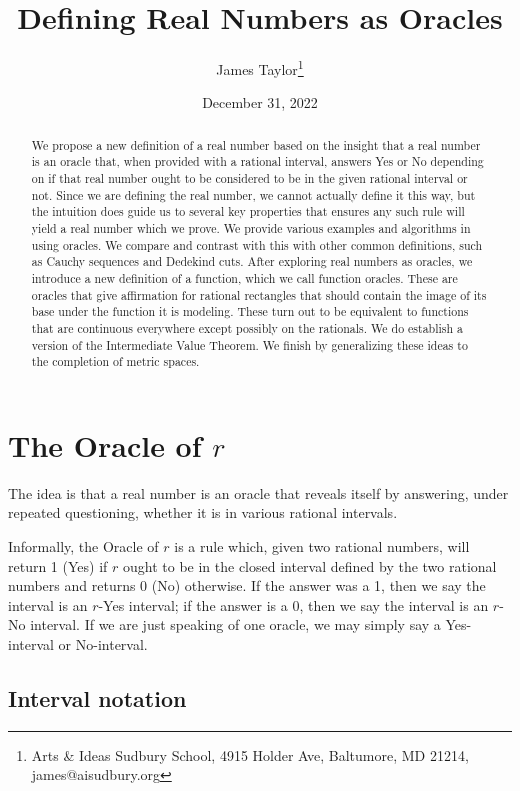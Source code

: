 \documentclass[12pt]{article}
\title{Defining Real Numbers as Oracles}
\author{
  James Taylor\footnote{Arts \& Ideas Sudbury School, 4915 Holder Ave, Baltumore, MD 21214, james@aisudbury.org}
}
\date{December 31, 2022}
\theoremstyle{remark}
\begin{document}
\maketitle
\begin{abstract}
 We propose a new definition of a real number based on the insight that a real number is an oracle that, when provided with a rational interval, answers Yes or No depending on if that real number ought to be considered to be in the given rational interval or not. Since we are defining the real number, we cannot actually define it this way, but the intuition does guide us to several key properties that ensures any such rule will yield a real number which we prove. We provide various examples and algorithms in using oracles. We compare and contrast with this with other common definitions, such as Cauchy sequences and Dedekind cuts. After exploring real numbers as oracles, we introduce a new definition of a function, which we call function oracles. These are oracles that give affirmation for rational rectangles that should contain the image of its base under the function it is modeling. These turn out to be equivalent to functions that are continuous everywhere except possibly on the rationals. We do establish a version of the Intermediate Value Theorem. We finish by generalizing these ideas to the completion of metric spaces. 
\end{abstract}

\tableofcontents

\section{The Oracle of $r$}\label{sec:ora}

The idea is that a real number is an oracle that reveals itself by answering, under repeated questioning, whether it is in various rational intervals. 

Informally, the Oracle of $r$ is a rule which, given two rational numbers, will return 1 (Yes) if $r$ ought to be in the closed interval defined by the two rational numbers and returns 0 (No) otherwise. If the answer was a 1, then we say the interval is an $r$-Yes interval; if the answer is a 0, then we say the interval is an $r$-No interval.  If we are just speaking of one oracle, we may simply say a Yes-interval or No-interval. 

\subsection{Interval notation}
\end{document}
